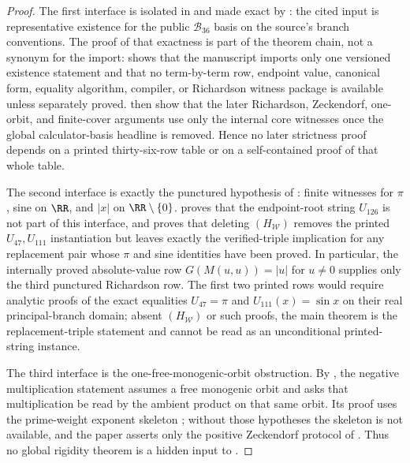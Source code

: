\begin{proof}
The first interface is isolated in  and made exact by
: the cited input is representative existence
for the public \(\mathcal B_{36}\) basis on the source's branch conventions.  The
proof of that exactness is part of the theorem chain, not a synonym for the
import:  shows that the manuscript imports only
one versioned existence statement and that no term-by-term row, endpoint value,
canonical form, equality algorithm, compiler, or Richardson witness package is
available unless separately proved.
then show that the later Richardson, Zeckendorf, one-orbit, and finite-cover
arguments use only the internal core witnesses once the global calculator-basis
headline is removed.  Hence no later strictness proof depends on a printed
thirty-six-row table or on a self-contained proof of that whole table.

The second interface is exactly the punctured hypothesis of :
finite witnesses for \(\pi\), sine on \(\RR\), and \(|x|\) on
\(\RR\setminus\{0\}\).   proves that the
endpoint-root string \(U_{126}\) is not part of this interface, and
 proves that deleting
\((H_{\mathcal W})\) removes the printed \(U_{47},U_{111}\) instantiation but
leaves exactly the verified-triple implication for any replacement pair whose
\(\pi\) and sine identities have been proved.  In particular, the internally
proved absolute-value row \(G(M(u,u))=|u|\) for \(u\ne0\) supplies only the third
punctured Richardson row.  The first two printed rows would require analytic
proofs of the exact equalities \(U_{47}=\pi\) and
\(U_{111}(x)=\sin x\) on their real principal-branch domain; absent
\((H_{\mathcal W})\) or such proofs, the main theorem is the replacement-triple
statement and cannot be read as an unconditional printed-string instance.

The third interface is the one-free-monogenic-orbit obstruction.  By
,
the negative multiplication statement assumes a free monogenic orbit and asks
that multiplication be read by the ambient product on that same orbit.  Its proof
uses the prime-weight exponent skeleton
; without those hypotheses the skeleton is
not available, and the paper asserts only the positive Zeckendorf protocol of
.  Thus no global rigidity theorem is a hidden
input to .


\end{proof}

